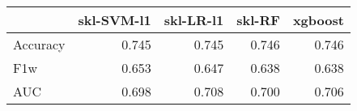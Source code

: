 \begin{tabular}{lrrrr}
\toprule
{} &  skl-SVM-l1 &  skl-LR-l1 &  skl-RF &  xgboost \\
\midrule
Accuracy &       0.745 &      0.745 &   0.746 &    0.746 \\
F1w      &       0.653 &      0.647 &   0.638 &    0.638 \\
AUC      &       0.698 &      0.708 &   0.700 &    0.706 \\
\bottomrule
\end{tabular}
